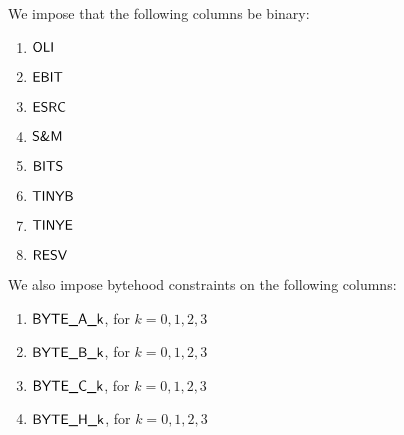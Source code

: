 We impose that the following columns be binary:
\begin{multicols}{4}
\begin{enumerate}
	\item $\textsf{OLI}{}$
	\item $\textsf{EBIT}{}$
	\item $\textsf{ESRC}{}$
	\item $\textsf{S\&M}{}$
	\item $\textsf{BITS}{}$
	\item $\textsf{TINYB}{}$
	\item $\textsf{TINYE}{}$
	\item $\textsf{RESV}{}$
\end{enumerate}
\end{multicols}
\noindent We also impose bytehood constraints on the following columns:
\begin{multicols}{2}
\begin{enumerate}
	\item $\textsf{BYTE}\textsf{\_A\_k}$, for $k=0,1,2,3$
	\item $\textsf{BYTE}\textsf{\_B\_k}$, for $k=0,1,2,3$
	\item $\textsf{BYTE}\textsf{\_C\_k}$, for $k=0,1,2,3$
	\item $\textsf{BYTE}\textsf{\_H\_k}$, for $k=0,1,2,3$
\end{enumerate}
\end{multicols}
\noindent{}